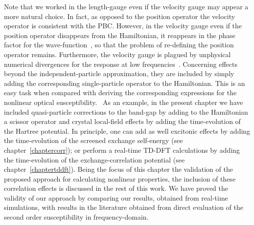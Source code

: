 Note that we worked in the length-gauge even if the velocity gauge may appear a more natural choice. In fact, as opposed to the position operator the velocity operator is consistent with the PBC. However, in the velocity gauge even if the position operator disappears from the Hamiltonian, it reappears in the phase factor for the wave-function~\cite{PhysRevA.36.2763}, so that the problem of re-defining the position operator remains. 
Furthermore, the velocity gauge is plagued by unphysical numerical divergences for the response at low frequencies~\cite{PhysRevB.52.14636}. 
Concerning effects beyond the independent-particle approximation, they are included by simply adding the corresponding single-particle operator to the Hamiltonian. This is an easy task when compared with deriving the corresponding expressions for the nonlinear optical susceptibility.~\cite{PhysRevB.80.155205,PhysRevB.80.165318} As an example, in the present chapter we have included quasi-particle corrections to the band-gap by adding to the Hamiltonian a scissor operator and crystal local-field effects by adding the time-evolution of the Hartree potential. In principle, one can add as well excitonic effects by adding the time-evolution of the screened exchange self-energy (see chapter~\ref{chaptercorr}); or perform a real-time TD-DFT calculations by adding the time-evolution of the exchange-correlation potential (see chapter~\ref{chaptertddft}). Being the focus of this chapter the validation of the proposed approach for calculating nonlinear properties, the inclusion of these correlation effects is discussed in the rest of this work.
We have proved the validity of our approach by comparing our results, obtained from real-time simulations, with results in the literature obtained from direct evaluation of the second order susceptibility in frequency-domain.  

